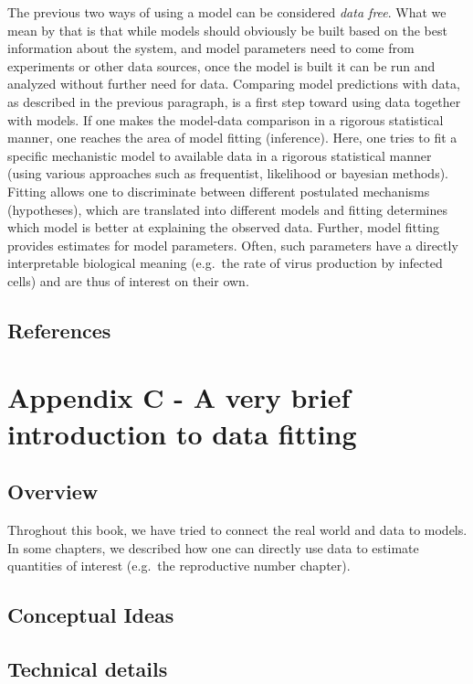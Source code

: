 \documentclass[]{book}
\theoremstyle{definition}
\theoremstyle{definition}
\theoremstyle{definition}
\theoremstyle{remark}
\begin{document}
The previous two ways of using a model can be considered \emph{data
free}. What we mean by that is that while models should obviously be
built based on the best information about the system, and model
parameters need to come from experiments or other data sources, once the
model is built it can be run and analyzed without further need for data.
Comparing model predictions with data, as described in the previous
paragraph, is a first step toward using data together with models. If
one makes the model-data comparison in a rigorous statistical manner,
one reaches the area of model fitting (inference). Here, one tries to
fit a specific mechanistic model to available data in a rigorous
statistical manner (using various approaches such as frequentist,
likelihood or bayesian methods). Fitting allows one to discriminate
between different postulated mechanisms (hypotheses), which are
translated into different models and fitting determines which model is
better at explaining the observed data. Further, model fitting provides
estimates for model parameters. Often, such parameters have a directly
interpretable biological meaning (e.g.~the rate of virus production by
infected cells) and are thus of interest on their own.

\section{References}\label{references-18}

\chapter{Appendix C - A very brief introduction to data
fitting}\label{appendix-c---a-very-brief-introduction-to-data-fitting}

\section{Overview}\label{overview-2}

Throghout this book, we have tried to connect the real world and data to
models. In some chapters, we described how one can directly use data to
estimate quantities of interest (e.g.~the reproductive number chapter).

\section{Conceptual Ideas}\label{conceptual-ideas}

\section{Technical details}\label{technical-details}
\end{document}
